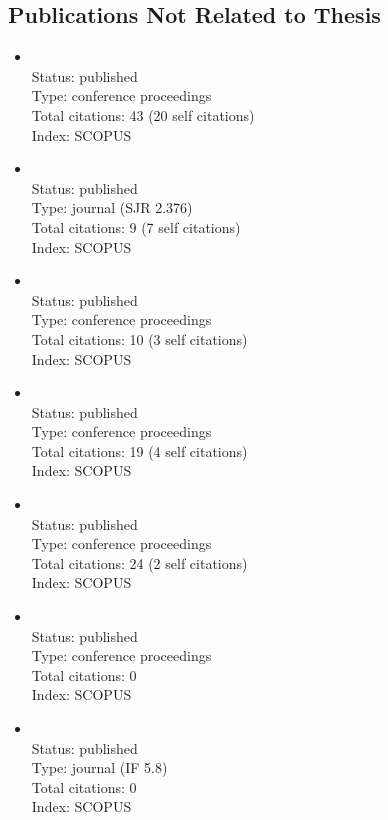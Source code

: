 \begin{refsection}
\section*{Publications Not Related to Thesis}
    \begin{itemize}
		\item{}\vspace{2mm}\\Status: published\\Type: conference proceedings\\Total citations: 43 (20 self citations)\\Index: SCOPUS
		\item{}\vspace{2mm}\\Status: published\\Type: journal (SJR 2.376)\\Total citations: 9 (7 self citations)\\Index: SCOPUS
		\item{}\vspace{2mm}\\Status: published\\Type: conference proceedings\\Total citations: 10 (3 self citations)\\Index: SCOPUS
		\item{}\vspace{2mm}\\Status: published\\Type: conference proceedings\\Total citations: 19 (4 self citations)\\Index: SCOPUS
		\item{}\vspace{2mm}\\Status: published\\Type: conference proceedings\\Total citations: 24 (2 self citations)\\Index: SCOPUS
		\item{}\vspace{2mm}\\Status: published\\Type: conference proceedings\\Total citations: 0\\Index: SCOPUS
		\item{}\vspace{2mm}\\Status: published\\Type: journal (IF 5.8)\\Total citations: 0\\Index: SCOPUS

\end{itemize}
\end{refsection}
